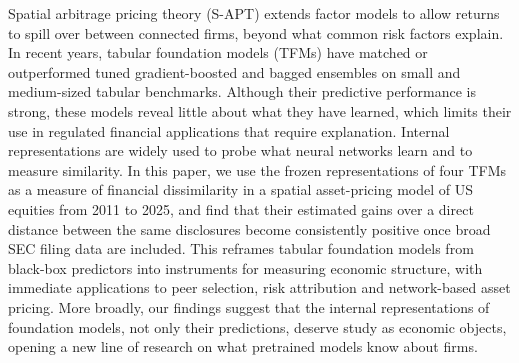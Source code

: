 Spatial arbitrage pricing theory (S-APT) extends factor models to allow
returns to spill over between connected firms, beyond what common risk
factors explain. In recent years, tabular foundation models (TFMs) have
matched or outperformed tuned gradient-boosted and bagged ensembles on
small and medium-sized tabular benchmarks. Although their predictive
performance is strong, these models reveal little about what they have
learned, which limits their use in regulated financial applications that
require explanation. Internal representations are widely used to probe
what neural networks learn and to measure similarity. In this paper, we use
the frozen representations of four TFMs as a measure of financial
dissimilarity in a spatial asset-pricing model of US equities from 2011 to
2025, and find that their estimated gains over a direct distance between
the same disclosures become consistently positive once broad SEC filing
data are included. This reframes tabular foundation models from black-box
predictors into instruments for measuring economic structure, with immediate
applications to peer selection, risk attribution and network-based
asset pricing.
More broadly, our findings suggest that the internal representations of
foundation models, not only their predictions, deserve study as economic
objects, opening a new line of research on what pretrained models know
about firms.
